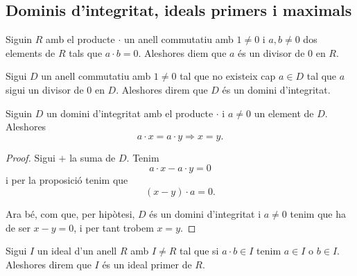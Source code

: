 \documentclass[../Apunts.tex]{subfiles}
\begin{document}
	\subsection{Dominis d'integritat, ideals primers i maximals}
	\begin{definition}[Divisor de 0]
		\label{def:divisor de 0 en un anell}
		Siguin \(R\) amb el producte \(\cdot\) un anell commutatiu amb \(1\neq0\) i \(a,b\neq0\) dos elements de \(R\) tals que \(a\cdot b=0\). Aleshores diem que \(a\) és un divisor de 0 en \(R\).
	\end{definition}
	\begin{definition}
		\label{def:domini d'integritat}
		\label{def:DI}
		Sigui \(D\) un anell commutatiu amb \(1\neq0\) tal que no existeix cap \(a\in D\) tal que \(a\) sigui un divisor de \(0\) en \(D\). Aleshores direm que \(D\) és un domini d'integritat.
	\end{definition}
	\begin{proposition}
		\label{prop:podem tatxar pels costats en DI}
		Siguin \(D\) un domini d'integritat amb el producte \(\cdot\) i \(a\neq0\) un element de \(D\). Aleshores
		\[a\cdot x=a\cdot y\Longrightarrow x=y.\]
		\begin{proof}
			Sigui \(+\) la suma de \(D\). Tenim
			\[a\cdot x-a\cdot y=0\]
			i per la proposició  tenim que
			\[(x-y)\cdot a=0.\]
			
			Ara bé, com que, per hipòtesi, \(D\) és un domini d'integritat i \(a\neq0\) tenim que ha de ser \(x-y=0\), i per tant trobem \(x=y\).
		\end{proof}
	\end{proposition}
	\begin{definition}
		\label{def:ideal primer}
		Sigui \(I\) un ideal d'un anell \(R\) amb \(I\neq R\) tal que si \(a\cdot b\in I\) tenim \(a\in I\) o \(b\in I\). Aleshores direm que \(I\) és un ideal primer de \(R\).
	\end{definition}
\end{document}
